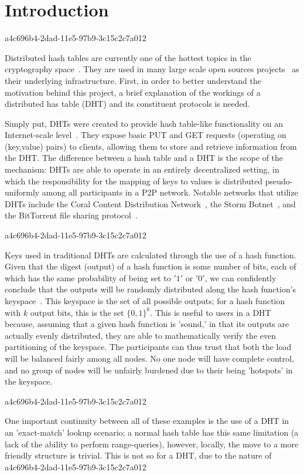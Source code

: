 \documentclass[12pt]{article}
\begin{document}
\section{Introduction}
a4c696b4-2dad-11e5-97b9-3c15c2c7a012\par Distributed hash tables are currently one of the hottest topics in the cryptography space~\cite{Stoica:2001dj,Rowstron:2001ea,Ratnasamy:2001wn}. They are used in many large scale open sources projects~\cite{Freitas:2013tb,Xu:2010vs,Perfitt:2010fh} as their underlying infrastructure. First, in order to better understand the motivation behind this project, a brief explanation of the workings of a distributed has table (DHT) and its constituent protocols is needed.

\par Simply put, DHTs were created to provide hash table-like functionality on an Internet-scale level~\cite{Ratnasamy:2001wn}. They expose basic PUT and GET requests (operating on (key,value) pairs) to clients, allowing them to store and retrieve information from the DHT. The difference between a hash table and a DHT is the scope of the mechanism: DHTs are able to operate in an entirely decentralized setting, in which the responsibility for the mapping of keys to values is distributed pseudo-uniformly among all participants in a P2P network. Notable networks that utilize DHTs include the Coral Content Distribution Network~\cite{Freedman:2004vb}, the Storm Botnet~\cite{Holz:2008uk}, and the BitTorrent file sharing protocol~\cite{Cohen:y1_8mBnw}.

a4c696b4-2dad-11e5-97b9-3c15c2c7a012\par Keys used in traditional DHTs are calculated through the use of a hash function. Given that the digest (output) of a hash function is some number of bits, each of which has the same probability of being set to $'1'$ or $'0'$, we can confidently conclude that the outputs will be randomly distributed along the hash function's keyspace~. This keyspace is the set of all possible outputs; for a hash function with $k$ output bits, this is the set $\{0,1\}^k$. This is useful to users in a DHT because, assuming that a given hash function is 'sound,' in that its outputs are actually evenly distributed, they are able to mathematically verify the even partitioning of the keyspace. The participants can thus trust that both the load will be balanced fairly among all nodes. No one node will have complete control, and no group of nodes will be unfairly burdened due to their being 'hotspots' in the keyspace.~

a4c696b4-2dad-11e5-97b9-3c15c2c7a012\par One important continuity between all of these examples is the use of a DHT in an 'exact-match' lookup scenario; a normal hash table has this same limitation (a lack of the ability to perform range-queries), however, locally, the move to a more friendly structure is trivial. This is not so for a DHT, due to the nature of
\printbibliography
a4c696b4-2dad-11e5-97b9-3c15c2c7a012
\end{document}
